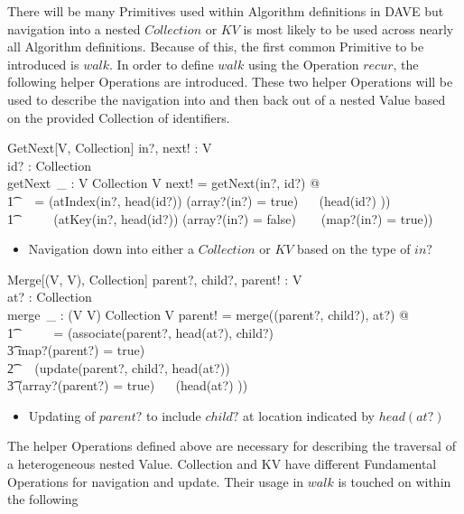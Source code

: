 \documentclass[../main.tex]{subfiles}
\begin{document}
There will be many Primitives used within Algorithm definitions in DAVE but
navigation into a nested $Collection$ or $KV$ is most likely to be used
across nearly all Algorithm definitions. Because of this, the first
common Primitive to be introduced is $walk$. In order to define $walk$
using the Operation $recur$, the following helper Operations are introduced.
These two helper Operations will be used to describe the navigation
into and then back out of a nested Value based on the provided
Collection of identifiers.
\begin{schema}{GetNext[V, Collection]}
  in?, next! : V \\
  id? : Collection \\
  getNext~\_ : V \cross Collection \surj V
  \where
  next! = getNext(in?, id?) @\\
  \t1 \ ~  = (atIndex(in?, head(id?)) \iff (array?(in?) = true) ~\land~ (head(id?) \in \nat)) ~\lor \\
  \t1 \ \ \ \ ~ (atKey(in?, head(id?)) \iff (array?(in?) = false) ~ \land ~ (map?(in?) = true))
\end{schema}
\begin{itemize}
  \item Navigation down into either a $Collection$ or $KV$ based on the type of $in?$
\end{itemize}
\begin{schema}{Merge[(V, V), Collection]}
  parent?, child?, parent! : V \\
  at? : Collection \\
  merge~\_ : (V \cross V) \cross Collection \bij V
  \where
  parent! = merge((parent?, child?), at?) @ \\
  \t1 \ \ \ \ ~ = (associate(parent?, head(at?), child?) \\
  \t3 \iff map?(parent?) = true) ~ \lor \\
  \t2 \ ~ (update(parent?, child?, head(at?)) \\
  \t3 \iff (array?(parent?) = true) ~\land~ (head(at?) \in \nat))
\end{schema}
\begin{itemize}
  \item Updating of $parent?$ to include $child?$ at location indicated by $head(at?)$
\end{itemize}
The helper Operations defined above are necessary for describing
the traversal of a heterogeneous nested Value. Collection and KV have different Fundamental Operations
for navigation and update. Their usage in $walk$ is touched on within the following
\end{document}
